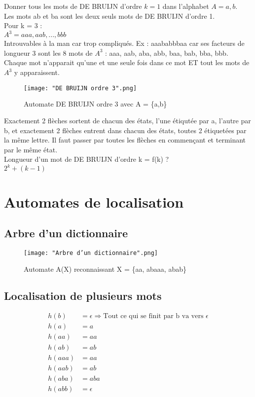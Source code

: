 \documentclass[11pt,a4paper]{article}
\begin{document}
	Donner tous les mots de DE BRUIJN d'ordre $k = 1$ dans l'alphabet $A = {a,b}$.\\
	Les mots ab et ba sont les deux seuls mots de DE BRUIJN d'ordre 1.\\
	
	Pour k = 3 :\\
	$A^3 = {aaa, aab, ..., bbb}$\\
	Introuvables à la man car trop compliqués. Ex : aaababbbaa car ses facteurs de longueur 3 sont les 8 mots de $A^3$ : aaa, aab, aba, abb, baa, bab, bba, bbb. Chaque mot n'apparait qu'une et une seule fois dans ce mot ET tout les mots de $A^3$ y apparaissent.

	\begin{figure}[ht]
		\centering
		\texttt{[image: "DE BRUIJN ordre 3".png]}
		\caption{Automate DE BRUIJN ordre 3 avec A = \{a,b\}}
	\end{figure}
	
	
	Exactement 2 flèches sortent de chacun des états, l'une étiqutée par a, l'autre par b, et exactement 2 flèches entrent dans chacun des états, toutes 2 étiquetées par la même lettre.
	Il faut passer par toutes les flèches en commençant et terminant par le même état.\\
	
	Longueur d'un mot de DE BRUIJN d'ordre k = f(k) ?\\
	$2^k + (k-1)$
	
	\newpage
	
	\section{Automates de localisation}
	
	\subsection{Arbre d'un dictionnaire}
	
	\begin{figure}[ht]
		\centering
		\texttt{[image: "Arbre d'un dictionnaire".png]}
		\caption{Automate A(X) reconnaissant X = \{aa, abaaa, abab\}}
	\end{figure}

	\subsection{Localisation de plusieurs mots}
	
	\begin{align*}
		h(b) &= \epsilon \Rightarrow \text{Tout ce qui se finit par b va vers }\epsilon\\
		h(a) &= a\\
		h(aa) &= aa\\
		h(ab) &= ab\\
		h(aaa) &= aa\\
		h(aab) &= ab\\
		h(aba) &= aba\\
		h(abb) &= \epsilon\\
	\end{align*}
	
\end{document}
